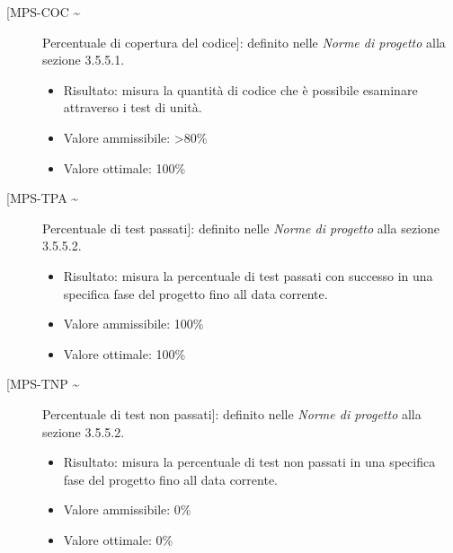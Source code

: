 \documentclass[../piano-di-qualifica.tex]{subfiles}
\begin{document}
\begin{description}
  \item [[MPS-COC \textasciitilde] Percentuale di copertura del codice]: definito nelle \textit{Norme di progetto} alla sezione 3.5.5.1.
        \begin{itemize} \item Risultato: misura la quantità di codice che è possibile esaminare attraverso i test di unità. \item Valore ammissibile: >80\% \item Valore ottimale: 100\% \end{itemize}
  \item [[MPS-TPA \textasciitilde] Percentuale di test passati]: definito nelle \textit{Norme di progetto} alla sezione 3.5.5.2.
        \begin{itemize} \item Risultato: misura la percentuale di test passati con successo in una specifica fase del progetto fino all data corrente. \item Valore ammissibile: 100\% \item Valore ottimale: 100\% \end{itemize}
  \item [[MPS-TNP \textasciitilde] Percentuale di test non passati]: definito nelle \textit{Norme di progetto} alla sezione 3.5.5.2.
        \begin{itemize} \item Risultato: misura la percentuale di test non passati in una specifica fase del progetto fino all data corrente. \item Valore ammissibile: 0\% \item Valore ottimale: 0\% \end{itemize}

\end{description}






\end{document}
